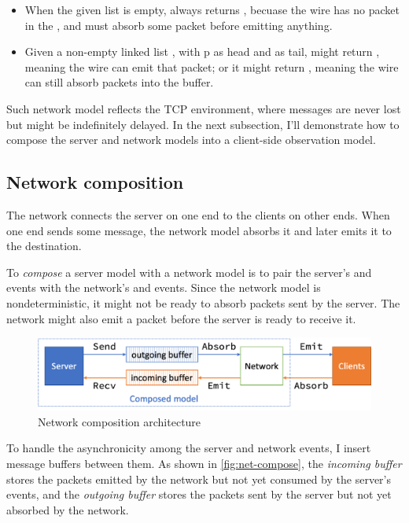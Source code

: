 \begin{itemize}
\item When the given list  is empty,  always returns
  , becuase the wire has no packet in the , and must
  absorb some packet before emitting anything.
\item Given a non-empty linked list , with \ilc p as head and
   as tail,  might return , meaning the wire
  can emit that packet; or it might return , meaning the wire can
  still absorb packets into the buffer.
\end{itemize}

Such network model reflects the TCP environment, where messages are never lost
but might be indefinitely delayed.  In the next subsection, I'll demonstrate how
to compose the server and network models into a client-side observation model.

\subsection{Network composition}
\label{sec:net-compose}

The network connects the server on one end to the clients on other ends.  When
one end sends some message, the network model absorbs it and later emits it to
the destination.

To {\em compose} a server model with a network model is to pair the server's
 and  events with the network's  and 
events.  Since the network model is nondeterministic, it might not be ready to
absorb packets sent by the server.  The network might also emit a packet before
the server is ready to receive it.

\begin{figure}
  \includegraphics[width=\textwidth]{figures/net-compose}
  \caption{Network composition architecture}
  \label{fig:net-compose}
\end{figure}

To handle the asynchronicity among the server and network events, I insert
message buffers between them.  As shown in \autoref{fig:net-compose}, the {\em
  incoming buffer} stores the packets emitted by the network but not yet
consumed by the server's  events, and the {\em outgoing buffer} stores
the packets sent by the server but not yet absorbed by the network.

